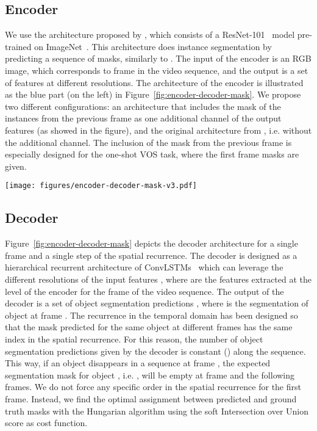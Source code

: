 \documentclass[10pt,twocolumn,letterpaper]{article}
\begin{document}
\subsection{Encoder}
We use the architecture proposed by \cite{Salvador17}, which consists of a ResNet-101~\cite{resnet} model pre-trained on ImageNet~\cite{imagenet}. This architecture does instance segmentation by predicting a sequence of masks, similarly to \cite{romera2016,ren2017}. The input  of the encoder is an RGB image, which corresponds to frame  in the video sequence, and the output  is a set of features at different resolutions. The architecture of the encoder is illustrated as the blue part (on the left) in Figure~\ref{fig:encoder-decoder-mask}. We propose two different configurations:  an architecture that includes the mask of the instances from the previous frame as one additional channel of the output features (as showed in the figure), and  the original architecture from \cite{Salvador17}, i.e. without the additional channel. The inclusion of the mask from the previous frame is especially designed for the one-shot VOS task, where the first frame masks are given.

\begin{figure*}
  \centering
  \texttt{[image: figures/encoder-decoder-mask-v3.pdf]}
  \caption{Our proposed recurrent architecture for video object segmentation for a a single frame at time step \textit{t}. The figure illustrates a single forward of the decoder, predicting only the first mask of the image.}
  \label{fig:encoder-decoder-mask}
\end{figure*}

\subsection{Decoder}

Figure~\ref{fig:encoder-decoder-mask} depicts the decoder architecture for a single frame and a single step of the spatial recurrence. The decoder is designed as a hierarchical recurrent architecture of ConvLSTMs~\cite{xingjian2015convolutional} which can leverage the different resolutions of the input features , where  are the features extracted at the level  of the encoder for the frame  of the video sequence. The output of the decoder is a set of object segmentation predictions , where  is the segmentation of object  at frame . The recurrence in the temporal domain has been designed so that the mask predicted for the same object at different frames has the same index in the spatial recurrence. For this reason, the number of object segmentation predictions given by the decoder is constant () along the sequence. This way, if an object  disappears in a sequence at frame , the expected segmentation mask for object , i.e. , will be empty at frame  and the following frames. We do not force any specific order in the spatial recurrence for the first frame. Instead, we find the optimal assignment between predicted and ground truth masks with the Hungarian algorithm using the soft Intersection over Union score as cost function.
\end{document}
